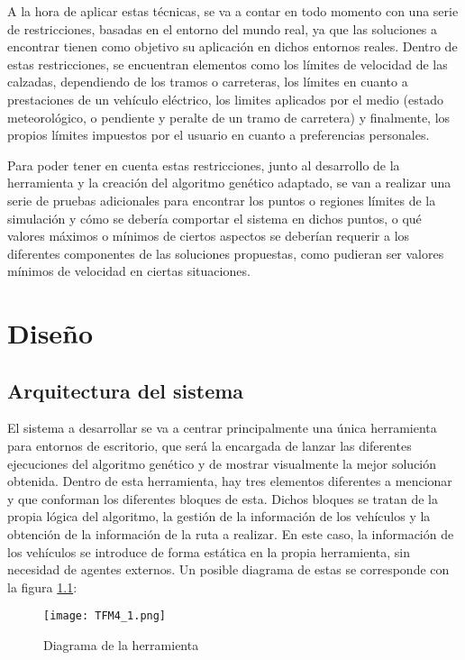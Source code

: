 \documentclass[11pt,spanish,listoffigures,listoftables]{tfgetsinf}
\begin{document}
A la hora de aplicar estas técnicas, se va a contar en todo momento con una serie de restricciones, basadas en el entorno del mundo real, ya que las soluciones a encontrar tienen como objetivo su aplicación en dichos entornos reales. Dentro de estas restricciones, se encuentran elementos como los límites de velocidad de las calzadas, dependiendo de los tramos o carreteras, los límites en cuanto a prestaciones de un vehículo eléctrico, los limites aplicados por el medio (estado meteorológico, o pendiente y peralte de un tramo de carretera) y finalmente, los propios límites impuestos por el usuario en cuanto a preferencias personales.

Para poder tener en cuenta estas restricciones, junto al desarrollo de la herramienta y la creación del algoritmo genético adaptado, se van a realizar una serie de pruebas adicionales para encontrar los puntos o regiones límites de la simulación y cómo se debería comportar el sistema en dichos puntos, o qué valores máximos o mínimos de ciertos aspectos se deberían requerir a los diferentes componentes de las soluciones propuestas, como pudieran ser valores mínimos de velocidad en ciertas situaciones.

\chapter{Diseño}
\section{Arquitectura del sistema}
El sistema a desarrollar se va a centrar principalmente una única herramienta para entornos de escritorio, que será la encargada de lanzar las diferentes ejecuciones del algoritmo genético y de mostrar visualmente la mejor solución obtenida. Dentro de esta herramienta, hay tres elementos diferentes a mencionar y que conforman los diferentes bloques de esta. Dichos bloques se tratan de la propia lógica del algoritmo, la gestión de la información de los vehículos y la obtención de la información de la ruta a realizar. En este caso, la información de los vehículos se introduce de forma estática en la propia herramienta, sin necesidad de agentes externos. Un posible diagrama de estas se corresponde con la figura \ref{fig:tool_diagram}:

\begin{figure}[!htb]
    \centering
    \texttt{[image: TFM4\_1.png]}    
    \caption{Diagrama de la herramienta}
    \label{fig:tool_diagram}
\end{figure}
\end{document}
